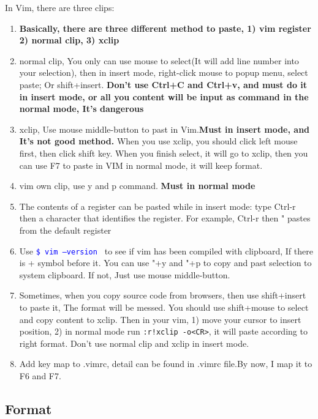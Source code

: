 \documentclass[paper=8.5in:11in, twoside, 12pt, pagesize=pdftex]{book}
\newcommand{\linuxcommand}[1]{\texttt{\textcolor{blue}{\$ #1 \Pisymbol{psy}{191}}}}
\begin{document}
	In Vim, there are three clips: 
		\begin{enumerate}
			\item \textbf{Basically, there are three different method to paste, 1) vim register 2) normal clip, 3) xclip} 
			
			\item normal clip, You only can use mouse to select(It will add line number into your selection), then in insert mode, right-click mouse to popup menu, select paste; Or shift+insert. \textbf{Don't use Ctrl+C and Ctrl+v, and must do it in insert mode, or all you content will be input as command in the normal mode, It's dangerous}
			
			
			\item xclip, Use mouse middle-button to past in Vim.\textbf{Must in insert mode, and It's not good method.} When you use xclip, you should click left mouse first, then click shift key. When you finish select, it will go to xclip, then you can use F7 to paste in VIM in normal mode, it will keep format. 
			
			\item vim own clip, use y and p command. \textbf{Must in normal mode}
			
			\item The contents of a register can be pasted while in insert mode: type Ctrl-r then a character that identifies the register. For example, Ctrl-r then " pastes from the default register
			
			\item Use \linuxcommand{vim --version} to see if vim has been compiled with clipboard, If there is + symbol before it. You can use "+y and "+p to copy and past selection to system clipboard. If not, Just use mouse middle-button.
			
			\item Sometimes, when you copy source code from browsers, then use shift+insert to paste it, The format will be messed. You should use shift+mouse to select and copy content to xclip. Then in your vim, 1) move your cursor to insert position, 2) in normal mode run \verb=:r!xclip -o<CR>=, it will paste according to right format. Don't use normal clip and xclip in insert mode.
			
			\item Add key map to .vimrc, detail can be found in .vimrc file.By now, I map it to F6 and F7. 
		\end{enumerate}

	
\subsection{Format}
\end{document}

